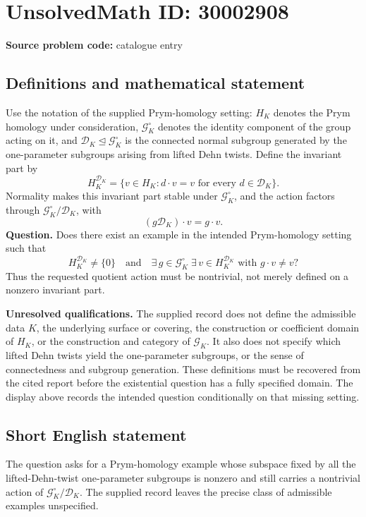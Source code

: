 \documentclass[11pt]{article}
\begin{document}
\section*{UnsolvedMath ID: 30002908}
\textbf{Source problem code:} catalogue entry
\subsection{Definitions and mathematical statement}
Use the notation of the supplied Prym-homology setting: \(H_K\) denotes the Prym homology under consideration, \(\mathcal G_K^\circ\) denotes the identity component of the group acting on it, and \(\mathcal D_K\trianglelefteq\mathcal G_K^\circ\) is the connected normal subgroup generated by the one-parameter subgroups arising from lifted Dehn twists. Define the invariant part by
\[
H_K^{\mathcal D_K}=\{v\in H_K: d\cdot v=v\text{ for every }d\in\mathcal D_K\}.
\]
Normality makes this invariant part stable under \(\mathcal G_K^\circ\), and the action factors through \(\mathcal G_K^\circ/\mathcal D_K\), with
\[
(g\mathcal D_K)\cdot v=g\cdot v.
\]
\textbf{Question.} Does there exist an example in the intended Prym-homology setting such that
\[
H_K^{\mathcal D_K}\neq\{0\}
\quad\text{and}\quad
\exists\,g\in\mathcal G_K^\circ\;\exists\,v\in H_K^{\mathcal D_K}
\text{ with }g\cdot v\neq v?
\]
Thus the requested quotient action must be nontrivial, not merely defined on a nonzero invariant part.

\textbf{Unresolved qualifications.} The supplied record does not define the admissible data \(K\), the underlying surface or covering, the construction or coefficient domain of \(H_K\), or the construction and category of \(\mathcal G_K\). It also does not specify which lifted Dehn twists yield the one-parameter subgroups, or the sense of connectedness and subgroup generation. These definitions must be recovered from the cited report before the existential question has a fully specified domain. The display above records the intended question conditionally on that missing setting.
\subsection{Short English statement}
The question asks for a Prym-homology example whose subspace fixed by all the lifted-Dehn-twist one-parameter subgroups is nonzero and still carries a nontrivial action of \(\mathcal G_K^\circ/\mathcal D_K\). The supplied record leaves the precise class of admissible examples unspecified.
\end{document}
